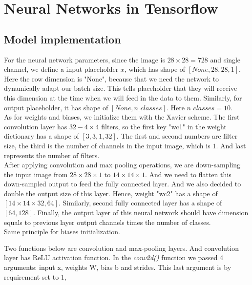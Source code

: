 \documentclass[10pt,letterpaper]{article}
\begin{document}
\section{Neural Networks in Tensorflow}



\subsection{Model implementation}

 For the neural network parameters, since the image is $28\times 28 = 728$ and single channel, we define a input placeholder $x$, which has shape of $[None, 28, 28, 1]$. Here the row dimension is "None", because that we need the network to dynamically adapt our batch size. This tells placeholder that they will receive this dimension at the time when we will feed in the data to them. Similarly, for output placeholder, it has shape of $[None, n\_classes]$. Here $\textit{n\_classes}   = 10$. \\

As for weights and biases, we initialize them with the Xavier scheme. The first convolution layer has $32-4\times4$ filters, so the first key "wc1" in the weight dictionary has a shape of $[3, 3, 1, 32]$. The first and second numbers are filter size, the third is the number of channels in the input image, which is $1$. And last represents the number of filters.  \\

After applying convolution and max pooling operations, we are down-sampling the input image from $28\times28\times1$ to $14\times14\times1$. And we need to flatten this down-sampled output to feed the fully connected layer. And we also decided to double the output size of this layer. Hence, weight "wc2" has a shape of $[14\times14\times32, 64]$. Similarly, second fully connected layer has a shape of $[64, 128]$. Finally, the output layer of this neural network should have dimension equals to previous layer output channels times the number of classes.  \\

Same principle for biases initialization.  



Two functions below are convolution and max-pooling layers. And convolution layer has ReLU activation function. In the \textit{conv2d()} function we passed 4 arguments: input x, weights W, bias b and strides. This last argument is by requirement set to 1,
\end{document}

